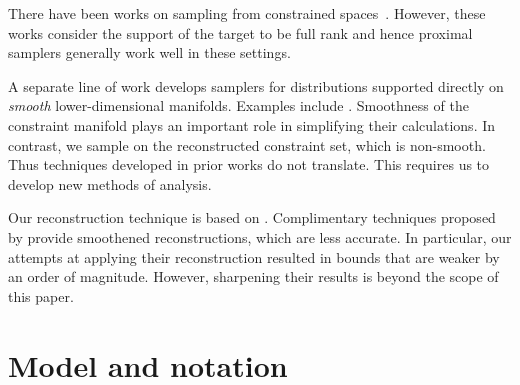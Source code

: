 \documentclass{article}
\newcommand{\imon}[1]{{\color{purple} #1}}
\numberwithin{equation}{section}
\begin{document}
There have been works on sampling from constrained spaces~\citep{brosse2017proximal, pmlr-v134-lee21a,chen2022proximal}. However, these works consider the support of the target to be full rank and hence proximal samplers generally work well in these settings.

A separate line of work develops samplers for distributions supported directly on \textit{smooth} lower-dimensional manifolds. Examples include \cite{brubaker2012manifolds,byrne2013geodesic,zappa2018montecarlo,lelievre2019hybrid}. Smoothness of the constraint manifold plays an important role in simplifying their calculations. In contrast, we sample on the reconstructed constraint set, which is non-smooth. Thus techniques developed in prior works do not translate. This requires us to develop new methods of analysis. 

Our reconstruction technique is based on \cite{divol2021}. Complimentary techniques proposed by \cite{fefferman2019} provide smoothened reconstructions, which are less accurate. In particular, our attempts at applying their reconstruction resulted in bounds that are weaker by an order of magnitude. However, sharpening their results is beyond the scope of this paper.






\section{Model and notation}\label{sec:model}
\end{document}
